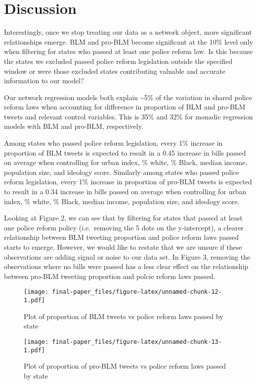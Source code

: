 \documentclass[12pt]{article}
\begin{document}
\hypertarget{discussion}{%
\section{Discussion}\label{discussion}}

Interestingly, once we stop treating our data as a network object, more
significant relationships emerge. BLM and pro-BLM become significant at
the 10\% level only when filtering for states who passed at least one
police reform law. Is this because the states we excluded passed police
reform legislation outside the specified window or were those excluded
states contributing valuable and accurate information to our model?

Our network regression models both explain \textasciitilde5\% of the
variation in shared police reform laws when accounting for difference in
proportion of BLM and pro-BLM tweets and relevant control variables.
This is 35\% and 32\% for monadic regression models with BLM and
pro-BLM, respectively.

Among states who passed police reform legislation, every 1\% increase in
proportion of BLM tweets is expected to result in a 0.45 increase in
bills passed on average when controlling for urban index, \% white, \%
Black, median income, population size, and ideology score. Similarly
among states who passed police reform legislation, every 1\% increase in
proportion of pro-BLM tweets is expected to result in a 0.34 increase in
bills passed on average when controlling for urban index, \% white, \%
Black, median income, population size, and ideology score.

Looking at Figure 2, we can see that by filtering for states that passed
at least one police reform policy (i.e.~removing the 5 dots on the
y-intercept), a clearer relationship between BLM tweeting proportion and
police reform laws passed starts to emerge. However, we would like to
restate that we are unsure if these observations are adding signal or
noise to our data set. In Figure 3, removing the observations where no
bills were passed has a less clear effect on the relationship between
pro-BLM tweeting proportion and polcie reform laws passed.

\begin{figure}
\centering
\texttt{[image: final-paper\_files/figure-latex/unnamed-chunk-12-1.pdf]}
\caption{Plot of proportion of BLM tweets vs police reform laws passed
by state}
\end{figure}

\begin{figure}
\centering
\texttt{[image: final-paper\_files/figure-latex/unnamed-chunk-13-1.pdf]}
\caption{Plot of proportion of pro-BLM tweets vs police reform laws
passed by state}
\end{figure}
\end{document}
